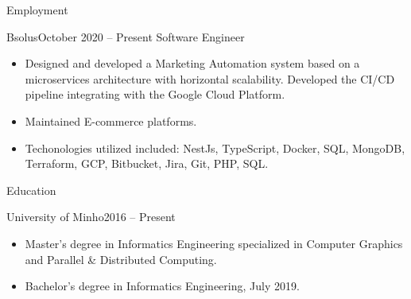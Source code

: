 \documentclass[]{mcdowellcv}
\begin{document}
	\makeheader

	\begin{cvsection}{Employment}
		\begin{cvsubsection}{Bsolus}{}{October 2020 -- Present}
			Software Engineer
			\begin{itemize}
                \item Designed and developed a Marketing Automation system based on a microservices architecture with horizontal scalability. Developed the CI/CD pipeline integrating with the Google Cloud Platform.
                \item Maintained E-commerce platforms.
                \item Techonologies utilized included: NestJs, TypeScript, Docker, SQL, MongoDB, Terraform, GCP, Bitbucket, Jira, Git, PHP, SQL.
			\end{itemize}
		\end{cvsubsection}
	\end{cvsection}

	\begin{cvsection}{Education}
		\begin{cvsubsection}{University of Minho}{}{2016 -- Present}
			\begin{itemize}
                \item Master’s degree in Informatics Engineering specialized in Computer Graphics and Parallel & Distributed Computing.
                \item Bachelor's degree in Informatics Engineering, July 2019.
			\end{itemize}
		\end{cvsubsection}
	\end{cvsection}
\end{document}
